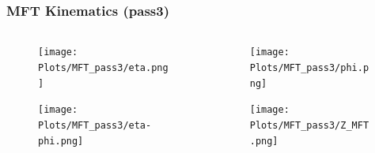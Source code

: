 \documentclass[11pt]{beamer}
\begin{document}
\begin{frame}
    \frametitle{MFT Kinematics (pass3)}

    \begin{columns}[c]
        \begin{column}{0.5\textwidth}
            \begin{figure}
                \begin{center}
                    \texttt{[image: Plots/MFT\_pass3/eta.png]}
                \end{center}
            \end{figure}
            \begin{figure}
                \begin{center}
                    \texttt{[image: Plots/MFT\_pass3/eta-phi.png]}
                \end{center}
            \end{figure}
        \end{column}
        \begin{column}{0.5\textwidth}
            \begin{figure}
                \begin{center}
                    \texttt{[image: Plots/MFT\_pass3/phi.png]}
                \end{center}
            \end{figure}
            \begin{figure}
                \begin{center}
                    \texttt{[image: Plots/MFT\_pass3/Z\_MFT.png]}
                \end{center}
            \end{figure}
        \end{column}
    \end{columns}

\end{frame}
\end{document}
